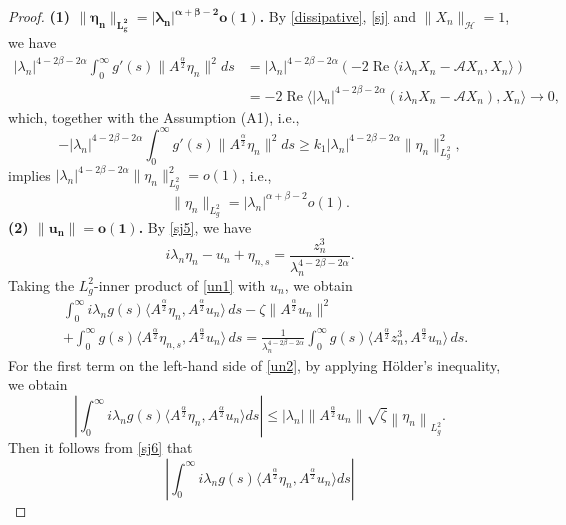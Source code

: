 \documentclass[12pt,reqno]{article}
\begin{document}
\begin{proof}
{\bf \noindent(1) $\bm{\|\eta_n\|_{L_g^2}=|\lambda_n|^{\alpha + \beta - 2}o(1)}$.}
		By \eqref{dissipative}, \eqref{sj} and $\|X_n\|_{\mathcal{H}}=1$, we have
		\begin{align*}
			|\lambda_n|^{4 - 2\beta - 2\alpha} \int_0^\infty g'(s) \|A^{\frac{\alpha}{2}} \eta_n\|^2 ds
			&= |\lambda_n|^{4 - 2\beta - 2\alpha}  \left(-2\operatorname{Re} \langle i\lambda_n X_n -\mathcal{A} X_n, X_n \rangle\right) \\
			&= -2\operatorname{Re} \langle |\lambda_n|^{4 - 2\beta - 2\alpha} (i\lambda_n X_n - \mathcal{A} X_n), X_n \rangle \to 0,
		\end{align*}
which, together with the Assumption (A1), i.e.,
		\[
-|\lambda_n|^{4 - 2\beta - 2\alpha} \int_0^\infty g'(s) \|A^{\frac{\alpha}{2}} \eta_n\|^2 ds
		\geq k_1 |\lambda_n|^{4 - 2\beta - 2\alpha} \|\eta_n\|_{L_g^2}^2,
		\]
implies $|\lambda_n|^{4 - 2\beta - 2\alpha}\|\eta_n\|_{L_g^2}^2 =o(1)$,  i.e.,
		\begin{equation}\label{sj6}
			\|\eta_n\|_{L_g^2} =|\lambda_n|^{\alpha + \beta - 2} o(1).
		\end{equation}
		{\bf \noindent(2) $\bm{\|u_n\|=o(1)}$.} By \eqref{sj5}, we have
		\begin{equation}\label{un1}
			i\lambda_n \eta_n - u_n + \eta_{n,s} = \frac{z_n^3}{\lambda_n^{4 - 2\beta - 2\alpha}}.
		\end{equation}
Taking the $L_g^2$-inner product of \eqref{un1} with $u_n$, we obtain
		\begin{align}\label{un2}
			&\int_0^\infty i\lambda_n g(s)\langle A^{\frac{\alpha}{2}}\eta_n, A^{\frac{\alpha}{2}}u_n \rangle \, ds
			- \zeta\|A^{\frac{\alpha}{2}}u_n\|^2  \nonumber \\
			&+ \int_0^\infty g(s)\langle A^{\frac{\alpha}{2}}\eta_{n,s}, A^{\frac{\alpha}{2}}u_n \rangle \, ds
			= \frac{1}{\lambda_n^{4-2\beta-2\alpha}}
			\int_0^\infty g(s)\langle A^{\frac{\alpha}{2}}z_n^3, A^{\frac{\alpha}{2}}u_n \rangle \, ds.
		\end{align}
		For the first term on the left-hand side of \eqref{un2}, by applying H\"older's inequality, we obtain
\[\left| \int_0^\infty i\lambda_n g(s) \langle A^{\frac{\alpha}{2}} \eta_n, A^{\frac{\alpha}{2}} u_n \rangle ds \right|
			\leq |\lambda_n| \| A^{\frac{\alpha}{2}} u_n \| \sqrt{\zeta} \left\| \eta_n \right\|_{L_g^2}.\]
Then it follows from \eqref{sj6} that
		\begin{equation}\label{un3}
			\left| \int_0^\infty i\lambda_n g(s) \langle A^{\frac{\alpha}{2}} \eta_n, A^{\frac{\alpha}{2}} u_n \rangle ds \right|

\end{equation}
\end{proof}
\end{document}
